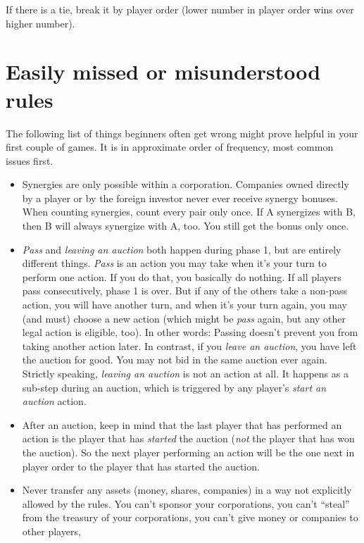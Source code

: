 \documentclass[10pt,final]{report}
\begin{document}
\begin{multicols}{2}
If there is a tie, break it by player order (lower number in player
order wins over higher number).

\section{Easily missed or misunderstood rules}

The following list of things beginners often get wrong might prove
helpful in your first couple of games. It is in approximate order of
frequency, most common issues first.

\begin{itemize}
\item Synergies are only possible within a corporation. Companies
  owned directly by a player or by the foreign investor never ever
  receive synergy bonuses. When counting synergies, count every pair
  only once. If A synergizes with B, then B will always synergize with
  A, too. You still get the bonus only once.
\item \emph{Pass} and \emph{leaving an auction} both happen during
  phase 1, but are entirely different things. \emph{Pass} is an action
  you may take when it's your turn to perform one action. If you do
  that, you basically do nothing. If all players pass
  consecutively, phase 1 is over. But if any of the others take a
  non-pass action, you will have another turn, and when it's your turn
  again, you may (and must) choose a new action (which might be
  \emph{pass} again, but any other legal action is eligible, too). In
  other words: Passing doesn't prevent you from taking another action
  later. In contrast, if you \emph{leave an auction}, you have left
  the auction for good. You may not bid in the same auction ever
  again. Strictly speaking, \emph{leaving an auction} is not an action
  at all. It happens as a sub-step during an auction, which is
  triggered by any player's \emph{start an auction} action.
\item After an auction, keep in mind that the last player that has
  performed an action is the player that has \emph{started} the
  auction (\emph{not} the player that has won the auction). So the
  next player performing an action will be the one next in player
  order to the player that has started the auction.
\item Never transfer any assets (money, shares, companies) in a way
  not explicitly allowed by the rules. You can't sponsor your
  corporations, you can't ``steal'' from the treasury of your
  corporations, you can't give money or companies to other players,

\end{itemize}
\end{multicols}
\end{document}
